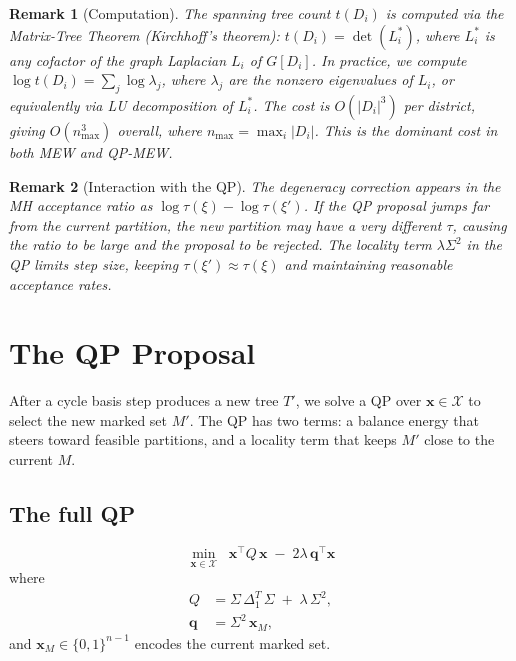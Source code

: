 \documentclass[11pt]{article}
\newtheorem{remark}{Remark}[section]
\begin{document}
\begin{remark}[Computation]
The spanning tree count $t(D_i)$ is computed via the Matrix-Tree Theorem (Kirchhoff's theorem): $t(D_i) = \det(L_i^*)$, where $L_i^*$ is any cofactor of the graph Laplacian $L_i$ of $G[D_i]$. In practice, we compute $\log t(D_i) = \sum_j \log \lambda_j$, where $\lambda_j$ are the nonzero eigenvalues of $L_i$, or equivalently via LU decomposition of $L_i^*$. The cost is $O(|D_i|^3)$ per district, giving $O(n_{\max}^3)$ overall, where $n_{\max} = \max_i |D_i|$. This is the dominant cost in both MEW and QP-MEW.
\end{remark}

\begin{remark}[Interaction with the QP]
The degeneracy correction appears in the MH acceptance ratio as $\log \tau(\xi) - \log \tau(\xi')$. If the QP proposal jumps far from the current partition, the new partition may have a very different $\tau$, causing the ratio to be large and the proposal to be rejected. The locality term $\lambda \Sigma^2$ in the QP limits step size, keeping $\tau(\xi') \approx \tau(\xi)$ and maintaining reasonable acceptance rates.
\end{remark}


\section{The QP Proposal}\label{sec:qp}

After a cycle basis step produces a new tree $T'$, we solve a QP over $\mathbf{x} \in \mathcal{X}$ to select the new marked set $M'$. The QP has two terms: a balance energy that steers toward feasible partitions, and a locality term that keeps $M'$ close to the current $M$.

\subsection{The full QP}

\begin{equation}\label{eq:qp}
\boxed{\min_{\mathbf{x} \in \mathcal{X}} \;\; \mathbf{x}^\top Q\, \mathbf{x} \;-\; 2\lambda\, \mathbf{q}^\top \mathbf{x}}
\end{equation}
where
\begin{align}
Q &= \Sigma\, \Delta_1^T\, \Sigma \;+\; \lambda\, \Sigma^2, \label{eq:Q} \\
\mathbf{q} &= \Sigma^2\, \mathbf{x}_M, \label{eq:q}
\end{align}
and $\mathbf{x}_M \in \{0,1\}^{n-1}$ encodes the current marked set.
\end{document}
